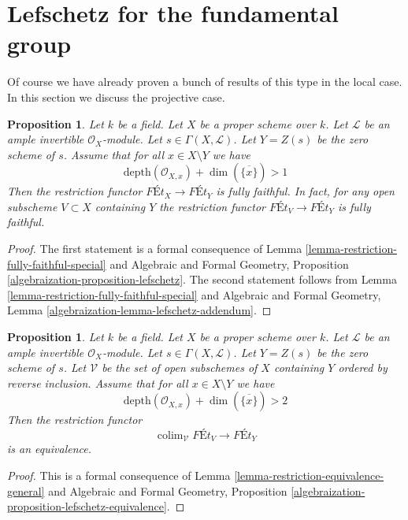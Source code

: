 \documentclass{stacks-project}
\theoremstyle{plain}
\newtheorem{proposition}[subsection]{Proposition}
\theoremstyle{definition}
\theoremstyle{remark}
\numberwithin{equation}{subsection}
\def\colim{\mathop{\mathrm{colim}}\nolimits}
\begin{document}
\section{Lefschetz for the fundamental group}
\label{section-global-lefschetz}

\noindent
Of course we have already proven a bunch of results of this type
in the local case. In this section we discuss the projective case.

\begin{proposition}
\label{proposition-lefschetz-fully-faithful}
Let $k$ be a field. Let $X$ be a proper scheme over $k$.
Let $\mathcal{L}$ be an ample invertible $\mathcal{O}_X$-module.
Let $s \in \Gamma(X, \mathcal{L})$. Let $Y = Z(s)$ be the
zero scheme of $s$. Assume that for all $x \in X \setminus Y$
we have
$$
\text{depth}(\mathcal{O}_{X, x}) + \dim(\overline{\{x\}}) > 1
$$
Then the restriction functor $\textit{F\'Et}_X \to \textit{F\'Et}_Y$
is fully faithful. In fact, for any open subscheme $V \subset X$
containing $Y$ the restriction functor
$\textit{F\'Et}_V \to \textit{F\'Et}_Y$
is fully faithful. 
\end{proposition}

\begin{proof}
The first statement is a formal consequence of
Lemma \ref{lemma-restriction-fully-faithful-special}
and
Algebraic and Formal Geometry, Proposition
\ref{algebraization-proposition-lefschetz}.
The second statement follows from
Lemma \ref{lemma-restriction-fully-faithful-special}
and
Algebraic and Formal Geometry, Lemma
\ref{algebraization-lemma-lefschetz-addendum}.
\end{proof}

\begin{proposition}
\label{proposition-lefschetz-equivalence-general}
Let $k$ be a field. Let $X$ be a proper scheme over $k$.
Let $\mathcal{L}$ be an ample invertible $\mathcal{O}_X$-module.
Let $s \in \Gamma(X, \mathcal{L})$. Let $Y = Z(s)$ be the
zero scheme of $s$. Let $\mathcal{V}$ be the set of open
subschemes of $X$ containing $Y$ ordered by reverse inclusion.
Assume that for all $x \in X \setminus Y$ we have
$$
\text{depth}(\mathcal{O}_{X, x}) + \dim(\overline{\{x\}}) > 2
$$
Then the restriction functor
$$
\colim_\mathcal{V} \textit{F\'Et}_V \to \textit{F\'Et}_Y
$$
is an equivalence.
\end{proposition}

\begin{proof}
This is a formal consequence of
Lemma \ref{lemma-restriction-equivalence-general} and
Algebraic and Formal Geometry, Proposition
\ref{algebraization-proposition-lefschetz-equivalence}.
\end{proof}
\end{document}
